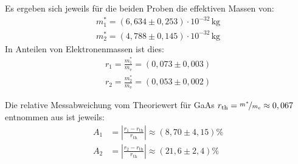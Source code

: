         Es ergeben sich jeweils für die beiden Proben die effektiven Massen von:
        \begin{align*}
            m^*_1 = (6,634 \pm 0,253) \cdot 10^{-32} \, \text{kg} \\[5pt]
            m^*_2 = (4,788 \pm 0,145) \cdot 10^{-32} \, \text{kg}
        \end{align*}
        In Anteilen von Elektronenmassen ist dies:
        \begin{align*}
            r_1 = \frac{m^*_1}{m_{\text{e}}} = (0,073 \pm 0,003) \\[7pt]
            r_2 = \frac{m^*_2}{m_{\text{e}}} = (0,053 \pm 0,002)
        \end{align*}

        Die relative Messabweichung vom Theoriewert für GaAs $r_{\text{th}} = \nicefrac{m^*}{m_{\text{e}}} \approx 0,067$ entnommen aus \cite{theeten_new_1978} ist jeweils:
        \begin{align*}
            A_1 &= \left|\frac{r_1 - r_{\text{th}}}{r_{\text{th}}}\right| \approx (8,70 \pm 4,15) \% \\[7pt]
            A_2 &= \left|\frac{r_2 - r_{\text{th}}}{r_{\text{th}}}\right| \approx (21,6 \pm 2,4) \%
        \end{align*}


















































